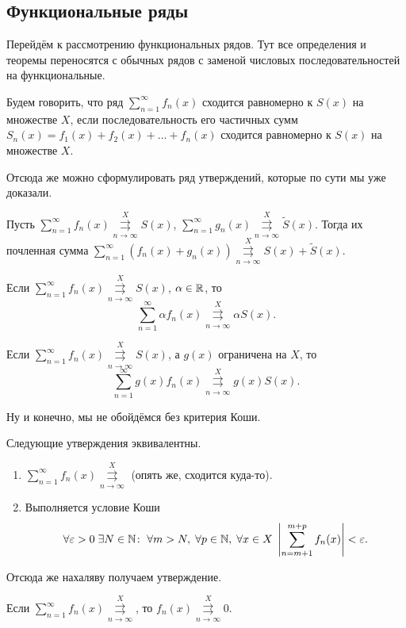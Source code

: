 	\subsection{Функциональные ряды}
	Перейдём к рассмотрению функциональных рядов. Тут все определения и теоремы переносятся с обычных рядов с заменой числовых последовательностей на функциональные.
	\begin{Def}
		Будем говорить, что ряд $\sum\limits_{n=1}^{\infty}f_n(x)$ сходится равномерно к $S(x)$ на множестве $X$, если последовательность его частичных сумм $S_n(x) = f_1(x) + f_2(x) + \ldots + f_n(x)$ сходится равномерно к $S(x)$ на множестве $X$. 
	\end{Def}
	Отсюда же можно сформулировать ряд утверждений, которые по сути мы уже доказали.
	\begin{Statement}
		Пусть $\sum\limits_{n=1}^\infty f_n(x) \overset{X}{\underset{n\to\infty}{\rightrightarrows}} S(x)$, 
		$\sum\limits_{n=1}^\infty g_n(x) \overset{X}{\underset{n\to\infty}{\rightrightarrows}} \tilde{S}(x)$. Тогда их почленная сумма $\sum\limits_{n=1}^\infty  (f_n(x) + g_n(x) ) \overset{X}{\underset{n\to\infty}{\rightrightarrows}} S(x) + \tilde{S}(x)$.
	\end{Statement}
	\begin{Statement}
		Если $\sum\limits_{n=1}^\infty f_n(x) \overset{X}{\underset{n\to\infty}{\rightrightarrows}} S(x)$, $\alpha \in \mathbb{R}$, то
		$$
			\sum\limits_{n=1}^\infty \alpha f_n(x) \overset{X}{\underset{n\to\infty}{\rightrightarrows}} \alpha S(x).
		$$
	\end{Statement}
	\begin{Statement}
		Если $\sum\limits_{n=1}^\infty f_n(x) \overset{X}{\underset{n\to\infty}{\rightrightarrows}} S(x)$, а $g(x)$ ограничена на $X$, то 
		$$
		\sum\limits_{n=1}^\infty g(x) f_n(x) \overset{X}{\underset{n\to\infty}{\rightrightarrows}} g(x)S(x).
		$$
	\end{Statement}
	Ну и конечно, мы не обойдёмся без критерия Коши.
	\begin{Statement}
		Следующие утверждения эквивалентны.
		\begin{enumerate}
			\item $\sum\limits_{n=1}^\infty f_n(x) \overset{X}{\underset{n\to\infty}{\rightrightarrows}}$ (опять же, сходится куда-то).
			\item Выполняется условие Коши 
			$$\forall \varepsilon >0\; \exists N \in \mathbb{N}\colon \; \forall m>N,\; \forall p \in \mathbb{N},\; \forall x\in X\; \left|\sum_{n=m+1}^{m+p} f_n(x)\right| < \varepsilon.
			$$
		\end{enumerate}
	\end{Statement}
	Отсюда же нахаляву получаем утверждение.
	\begin{Statement}
		Если $\sum\limits_{n=1}^\infty f_n(x)  \overset{X}{\underset{n\to\infty}{\rightrightarrows}}$, то $f_n(x) \overset{X}{\underset{n\to\infty}{\rightrightarrows}} 0$.
	\end{Statement}
